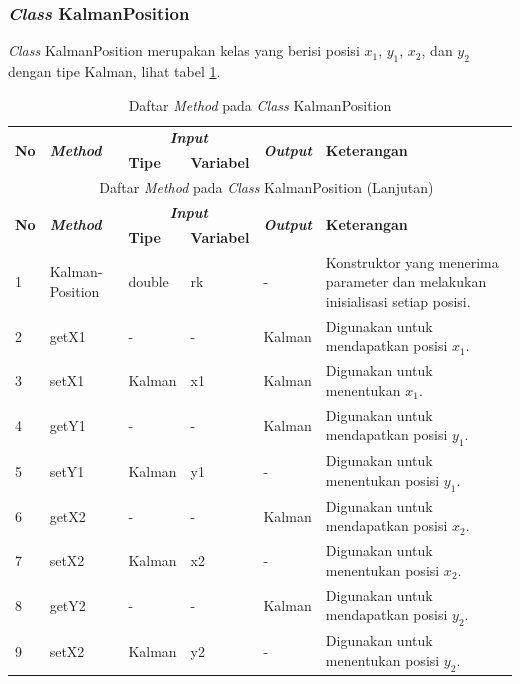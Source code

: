 \subsubsection{\textit{Class} KalmanPosition}
\noindent \textit{Class} KalmanPosition merupakan kelas yang berisi posisi $x_{1}$, $y_{1}$, $x_{2}$, dan $y_{2}$ dengan tipe Kalman, lihat tabel \ref{tbl:classKalmanPosition}.
\begingroup
\setlength{\LTleft}{-20cm plus -1fill}
\setlength{\LTright}{\LTleft}
\begin{small}
\begin{longtable}{|p{0.4cm}|p{2cm}|p{1.8cm}|p{1.8cm}|p{1.7cm}|p{3.55cm}|}
	\caption{Daftar \textit{Method} pada \textit{Class} KalmanPosition \label{tbl:classKalmanPosition}}\\
	\hline
	\multirow{2}{*}{\textbf{No}} & \multirow{2}{*}{\textit{\textbf{Method}}} & \multicolumn{2}{c|}{\textit{\textbf{Input}}} & \multirow{2}{*}{\textit{\textbf{Output}}} & 
	\multirow{2}{*}{\textbf{Keterangan}}\\
	\cline{3-4}
	& & \textbf{Tipe} & \textbf{Variabel} & & \\
	\endfirsthead
	\multicolumn{6}{c}{\textbf{\tablename~\thetable} Daftar \textit{Method} pada \textit{Class} KalmanPosition (Lanjutan)} \\
	\hline
	\multirow{2}{*}{\textbf{No}} & \multirow{2}{*}{\textit{\textbf{Method}}} & \multicolumn{2}{c|}{\textit{\textbf{Input}}} & \multirow{2}{*}{\textit{\textbf{Output}}} & 
	\multirow{2}{*}{\textbf{Keterangan}}\\
	\cline{3-4}
	& & \textbf{Tipe} & \textbf{Variabel} & & \\
	\endhead
	\hline
	1 & Kalman-\newline Position & double & rk & - & Konstruktor yang menerima parameter dan melakukan inisialisasi setiap posisi.\\
	\hline
	2 & getX1 & - & - & Kalman & Digunakan untuk mendapatkan posisi $x_{1}$.\\
	\hline
	3 & setX1 & Kalman & x1 & Kalman & Digunakan untuk menentukan $x_{1}$.\\
	\hline
	4 & getY1 & - & - & Kalman & Digunakan untuk mendapatkan posisi $y_{1}$.\\
	\hline
	5 & setY1 & Kalman & y1 & - & Digunakan untuk menentukan posisi $y_{1}$.\\
	\hline
	6 & getX2 & - & - & Kalman & Digunakan untuk mendapatkan posisi $x_{2}$.\\
	\hline
	7 & setX2 & Kalman & x2 & - & Digunakan untuk menentukan posisi $x_{2}$.\\
	\hline
	8 & getY2 & - & - & Kalman & Digunakan untuk mendapatkan posisi $y_{2}$.\\
	\hline
	9 & setX2 & Kalman & y2 & - & Digunakan untuk menentukan posisi $y_{2}$.\\
	\hline
\end{longtable}
\end{small}
\endgroup

